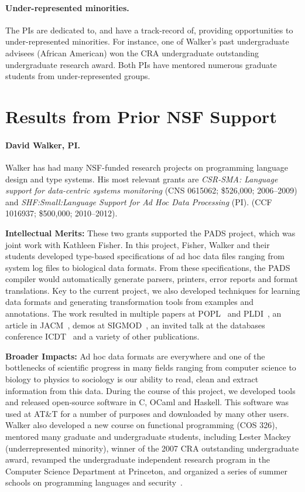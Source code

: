 \paragraph*{Under-represented minorities.} The PIs are dedicated
to, and have a track-record of, providing opportunities to under-represented 
minorities.  For instance, one of Walker's past undergraduate advisees
(African American) won the CRA undergraduate outstanding undergraduate
research award.  Both PIs have mentored numerous graduate students from 
under-represented groups.

\section{Results from Prior NSF Support}
\label{sec:prior-support}

\paragraph{David Walker, PI.}
Walker has had many NSF-funded research projects on programming language
design and type systems.  His most relevant grants are
 \emph{CSR-SMA: Language support for data-centric systems monitoring} (CNS 0615062; \$526,000; 2006--2009) and
\emph{SHF:Small:Language Support for Ad Hoc Data Processing} (PI). (CCF 1016937; \$500,000; 2010--2012).

{\bf Intellectual Merits:}
These two grants supported the PADS project, which was joint work with
Kathleen Fisher.  In this project, Fisher, Walker and their students
developed type-based specifications of ad hoc data files ranging from system
log files to biological data formats. From these specifications, 
the PADS compiler would automatically generate
parsers, printers, error reports and format translations. Key to the current
project, we also developed techniques for learning data formats and generating
transformation tools from examples and annotations.
The work resulted in multiple papers at POPL~\cite{fisher+:popl06,mandelbaum+:pads-ml,fisher+:dirttoshovels,jim:data-dependent-grammars} and PLDI~\cite{qian:markup}, an article in JACM~\cite{fisher+:jacm}, demos at SIGMOD~\cite{daly+:pads-demo,learnpads:demo}, an invited talk at the databases conference
ICDT~\cite{fisher:icdt} and a variety of other publications.

{\bf Broader Impacts:} Ad hoc data formats are everywhere and one of the
bottlenecks of scientific progress in many fields ranging from computer science
to biology to physics to sociology is our ability to read, clean and extract
information from this data.  During the course of this project, we developed 
tools and released open-source software in C, OCaml and Haskell. This software
was used at AT\&T for a number of purposes and downloaded by many other users.
Walker also developed a new course on functional programming (COS 326),
mentored many graduate and undergraduate students, 
including Lester Mackey (underrepresented minority), winner of the 2007 CRA 
outstanding undergraduate award, revamped the
undergraduate independent research program in the Computer Science
Department at Princeton, and organized a series of
summer schools on programming languages and security~\cite{summer06,summer07}.

